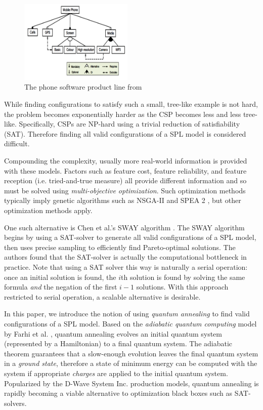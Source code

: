 \documentclass{sig-alternate-05-2015}
\begin{document}
\begin{figure}[!h]
\centering
\includegraphics[width=0.48\textwidth]{images/phone}
\caption{The phone software product line from \cite{benavides2010automated}}
\label{figure:phone}
\end{figure}

While finding configurations to satisfy such a small, tree-like example is not hard, the problem becomes exponentially harder as the CSP becomes less and less tree-like. Specifically, CSPs are NP-hard using a trivial reduction of satisfiability (SAT). Therefore finding all valid configurations of a SPL model is considered difficult.

Compounding the complexity, usually more real-world information is provided with these models. Factors such as feature cost, feature reliability, and feature reception (i.e. tried-and-true measure) all provide different information and so must be solved using \emph{multi-objective optimization}. Such optimization methods typically imply genetic algorithms such as NSGA-II \cite{deb2002fast} and SPEA 2 \cite{chang2007sub}, but other optimization methods apply.

One such alternative is Chen et al.'s SWAY algorithm \cite{chen2016sampling}. The SWAY algorithm begins by using a SAT-solver to generate all valid configurations of a SPL model, then uses precise sampling to efficiently find Pareto-optimal solutions. The authors found that the SAT-solver is actually the computational bottleneck in practice. Note that using a SAT solver this way is naturally a serial operation: once an initial solution is found, the $i$th solution is found by solving the same formula \emph{and} the negation of the first $i-1$ solutions. With this approach restricted to serial operation, a scalable alternative is desirable.

In this paper, we introduce the notion of using \emph{quantum annealing} to find valid configurations of a SPL model. Based on the \emph{adiabatic quantum computing} model by Farhi et al. \cite{farhi2000quantum}, quantum annealing evolves an initial quantum system (represented by a Hamiltonian) to a final quantum system. The adiabatic theorem \cite{farhi2000quantum} guarantees that a slow-enough evolution leaves the final quantum system in a \emph{ground state}, therefore a state of minimum energy can be computed with the system if appropriate \emph{charges} are applied to the initial quantum system. Popularized by the D-Wave System Inc. production models, quantum annealing is rapidly becoming a viable alternative to optimization black boxes such as SAT-solvers.
\end{document}
